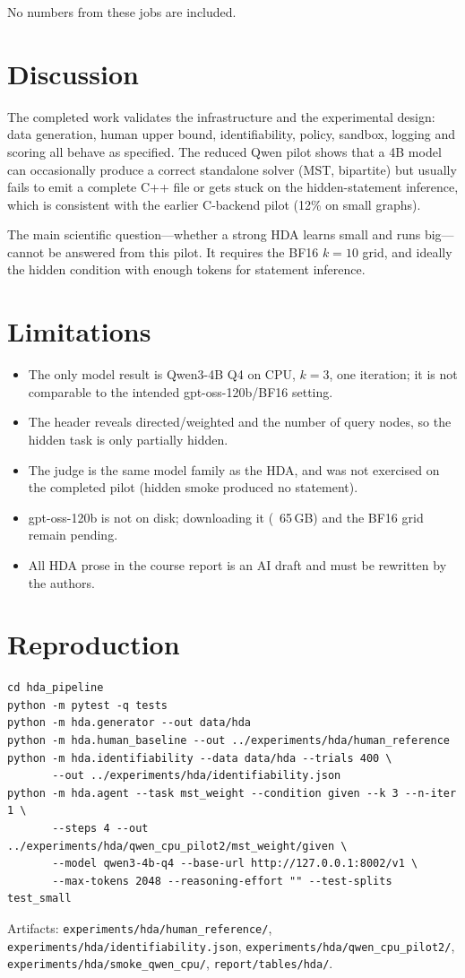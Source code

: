 \documentclass[11pt]{article}
\begin{document}
No numbers from these jobs are included.

\section{Discussion}

The completed work validates the infrastructure and the experimental design:
data generation, human upper bound, identifiability, policy, sandbox, logging
and scoring all behave as specified. The reduced Qwen pilot shows that a 4B
model can occasionally produce a correct standalone solver (MST, bipartite) but
usually fails to emit a complete C++ file or gets stuck on the hidden-statement
inference, which is consistent with the earlier C-backend pilot (12\% on small
graphs).

The main scientific question---whether a strong HDA learns small and runs
big---cannot be answered from this pilot. It requires the BF16 $k=10$ grid, and
ideally the hidden condition with enough tokens for statement inference.

\section{Limitations}

\begin{itemize}[leftmargin=1.4em]
\item The only model result is Qwen3-4B Q4 on CPU, $k=3$, one iteration; it is
not comparable to the intended gpt-oss-120b/BF16 setting.
\item The header reveals directed/weighted and the number of query nodes, so
the hidden task is only partially hidden.
\item The judge is the same model family as the HDA, and was not exercised on
the completed pilot (hidden smoke produced no statement).
\item gpt-oss-120b is not on disk; downloading it (~65\,GB) and the BF16 grid
remain pending.
\item All HDA prose in the course report is an AI draft and must be rewritten
by the authors.
\end{itemize}

\section{Reproduction}

\begin{verbatim}
cd hda_pipeline
python -m pytest -q tests
python -m hda.generator --out data/hda
python -m hda.human_baseline --out ../experiments/hda/human_reference
python -m hda.identifiability --data data/hda --trials 400 \
       --out ../experiments/hda/identifiability.json
python -m hda.agent --task mst_weight --condition given --k 3 --n-iter 1 \
       --steps 4 --out ../experiments/hda/qwen_cpu_pilot2/mst_weight/given \
       --model qwen3-4b-q4 --base-url http://127.0.0.1:8002/v1 \
       --max-tokens 2048 --reasoning-effort "" --test-splits test_small
\end{verbatim}

Artifacts: \texttt{experiments/hda/human\_reference/},
\texttt{experiments/hda/identifiability.json},
\texttt{experiments/hda/qwen\_cpu\_pilot2/},
\texttt{experiments/hda/smoke\_qwen\_cpu/},
\texttt{report/tables/hda/}.
\end{document}
